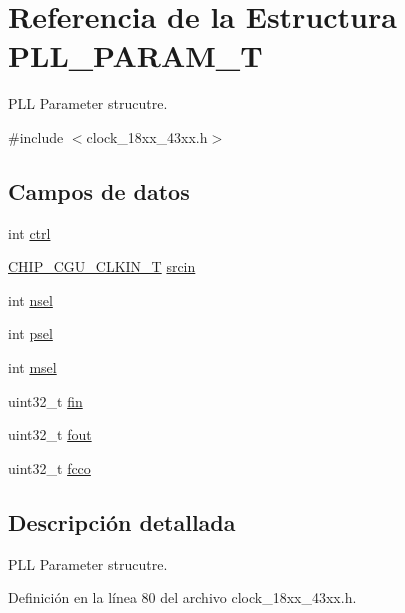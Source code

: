 \hypertarget{struct_p_l_l___p_a_r_a_m___t}{}\section{Referencia de la Estructura P\+L\+L\+\_\+\+P\+A\+R\+A\+M\+\_\+T}
\label{struct_p_l_l___p_a_r_a_m___t}


P\+LL Parameter strucutre.  




{\ttfamily \#include $<$clock\+\_\+18xx\+\_\+43xx.\+h$>$}

\subsection*{Campos de datos}
\begin{DoxyCompactItemize}
\item 
int \hyperlink{struct_p_l_l___p_a_r_a_m___t_a0f787778e7019ca3a8bdf0bd17b9efca}{ctrl}
\item 
\hyperlink{group___c_l_o_c_k__18_x_x__43_x_x_ga0975326707efebf2b074283e6c602f18}{C\+H\+I\+P\+\_\+\+C\+G\+U\+\_\+\+C\+L\+K\+I\+N\+\_\+T} \hyperlink{struct_p_l_l___p_a_r_a_m___t_ae499b9c398971cae537e4efff747fd93}{srcin}
\item 
int \hyperlink{struct_p_l_l___p_a_r_a_m___t_a4039a5f518d03f563944c3ca79285fca}{nsel}
\item 
int \hyperlink{struct_p_l_l___p_a_r_a_m___t_a372f2e371b89055c7bd0ce0b1cbb7999}{psel}
\item 
int \hyperlink{struct_p_l_l___p_a_r_a_m___t_a88dabd3e5dcfeffa266684c49ed2c4af}{msel}
\item 
uint32\+\_\+t \hyperlink{struct_p_l_l___p_a_r_a_m___t_af5a04d171f69a163802bae85897b7fd0}{fin}
\item 
uint32\+\_\+t \hyperlink{struct_p_l_l___p_a_r_a_m___t_a09cb0437c53eac4c683dc592b6e8abf3}{fout}
\item 
uint32\+\_\+t \hyperlink{struct_p_l_l___p_a_r_a_m___t_a95fa8353e67576bbba4c6bfb87adecc9}{fcco}
\end{DoxyCompactItemize}


\subsection{Descripción detallada}
P\+LL Parameter strucutre. 

Definición en la línea 80 del archivo clock\+\_\+18xx\+\_\+43xx.\+h.



